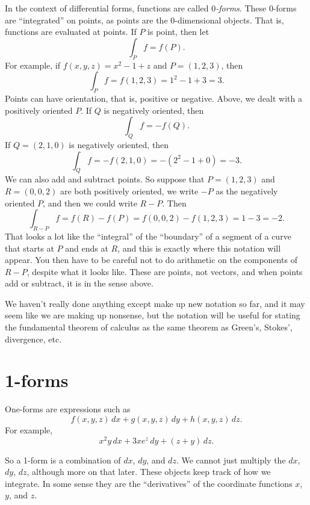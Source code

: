 \documentclass[12pt]{article}
\begin{document}
In the context of differential forms,
functions are called \emph{$0$-forms}.  These $0$-forms are ``integrated''
on points, as points are the $0$-dimensional objects.
That is, functions are evaluated at points.  If $P$ is point, then let
\[
\int_P f = f(P) .
\]
For example,
if $f(x,y,z) = x^2-1+z$ and $P=(1,2,3)$, then
\[
\int_P f = f(1,2,3) = 1^2-1+3 =3 .
\]
Points can have orientation, that is, positive or negative.  Above, we dealt
with a positively oriented $P$.  If $Q$ is negatively oriented, then 
\[
\int_Q f = -f(Q).
\]
If $Q = (2,1,0)$ is negatively oriented, then
\[
\int_Q f = -f(2,1,0) = -( 2^2-1+0 ) = -3.
\]
We can also add and subtract points.  So suppose that $P=(1,2,3)$ and
$R = (0,0,2)$ are both positively oriented, we write $-P$ as the negatively
oriented $P$, and then we could write $R-P$.  Then
\[
\int_{R-P} f = f(R)-f(P) = f(0,0,2)-f(1,2,3) = 1-3 = -2.
\]
That looks a lot like the ``integral'' of the ``boundary'' of a segment of
a curve that starts at $P$ and ends at $R$, and this is exactly where this
notation will appear.
You then have to be careful
not to do arithmetic on the components of $R-P$, despite what it looks like.
These are points, not vectors, and when points add or subtract, it is in the
sense above.

We haven't really done anything except make up new notation so far, and
it may seem like we are making up nonsense, but the notation will be useful for
stating the fundamental theorem of calculus as the same theorem as
Green's, Stokes', divergence, etc.

\section*{1-forms}

One-forms are expressions such as
\[
f(x,y,z) \, dx + 
g(x,y,z) \, dy + 
h(x,y,z) \, dz .
\]
For example,
\[
x^2y \, dx + 
3xe^z \, dy + 
(z+y) \, dz .
\]

So a 1-form is a combination of $dx$, $dy$, and $dz$.  We cannot just
multiply the $dx$, $dy$, $dz$, although more on that later.  These objects
keep track of how we integrate.  In some sense they are the ``derivatives''
of the coordinate functions $x$, $y$, and $z$.
\end{document}

